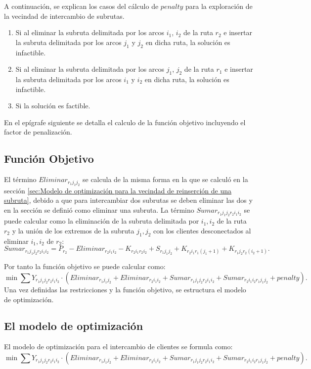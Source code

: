 \documentclass[12pt]{report}
\begin{document}
	A continuación, se explican los casos del cálculo de $penalty$ para la exploración de la vecindad de intercambio de subrutas.
	\begin{enumerate}
		\item Si al eliminar la subruta delimitada por los arcos $i_1$, $i_2$ de la ruta $r_2$ e insertar la subruta delimitada por los arcos $j_1$ y $j_2$ en dicha ruta, la solución es infactible.
		\item Si al eliminar la subruta delimitada por los arcos $j_1$, $j_2$ de la ruta $r_1$ e insertar la subruta delimitada por los arcos $i_1$ y $i_2$ en dicha ruta, la solución es infactible.
		\item Si la solución es factible.
	\end{enumerate}

	En el epígrafe siguiente se detalla el calculo de la función objetivo incluyendo el factor de penalización.

	\subsection{Función Objetivo}
    El término $Eliminar_{r_1j_1j_2}$ se calcula de la misma forma en la que se calculó en la sección \ref{sec:Modelo de optimización para la vecindad de reinserción de una subruta}, debido a que para intercambiar dos subrutas se deben eliminar las dos y en la sección se definió como eliminar una subruta. La término $Sumar_{r_1j_1j_2r_2i_1i_2}$ se puede calcular como la eliminación de la subruta delimitada por $i_1,i_2$ de la ruta $r_2$ y la unión de los extremos de la subruta $j_1,j_2$ con los clientes desconectados al eliminar $i_1,i_2$ de $r_2$:
    \[
    Sumar_{r_1j_1j_2r_2i_1i_2}= P_{r_2} - Eliminar_{r_2i_1i_2}-K_{{r_2}{i_1}{r_2}{i_2}}+S_{{r_1}{j_1}{j_2}}+K_{{r_2}{i_1}{r_1}{(j_1+1)}} + K_{{r_1}{j_2}{r_2}{(i_2+1)}}.
    \]

    Por tanto la función objetivo se puede calcular como:
    \[
    \min \sum Y_{r_1j_1j_2r_2i_1i_2} \cdot (Eliminar_{r_1j_1j_2} + Eliminar_{r_2i_1i_2} + Sumar_{r_1j_1j_2r_2i_1i_2} +Sumar_{r_2i_1i_2r_1j_1j_2} + penalty).
    \]
    Una vez definidas las restricciones y la función objetivo, se estructura el modelo de optimización.
	\subsection{El modelo de optimización}

	El modelo de optimización para el intercambio de clientes se formula como:
	\[
	\min \sum Y_{r_1j_1j_2r_2i_1i_2} \cdot (Eliminar_{r_1j_1j_2} + Eliminar_{r_2i_1i_2} + Sumar_{r_1j_1j_2r_2i_1i_2} +Sumar_{r_2i_1i_2r_1j_1j_2} + penalty).
    \]
\end{document}
